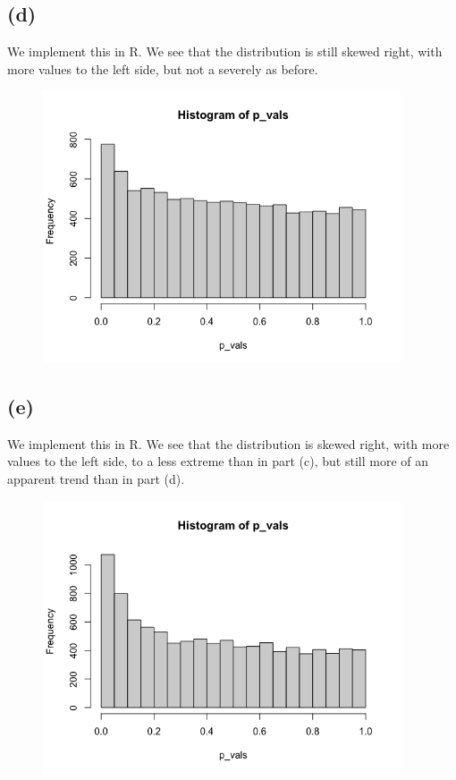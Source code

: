 \documentclass{article}
\begin{document}
{\subsection*{(d)}

We implement this in R. We see that the distribution is still skewed right, with more values to the left side, but not a severely as before.
\begin{figure}[h!]
  \centering
  \includegraphics[width=300pt]{hw7_2d.png}
\end{figure}

\subsection*{(e)}

We implement this in R. We see that the distribution is skewed right, with more values to the left side, to a less extreme than in part (c), but still more of an apparent trend than in part (d).
\begin{figure}[h!]
  \centering
  \includegraphics[width=300pt]{hw7_2e.png}
\end{figure}

}
\end{document}

